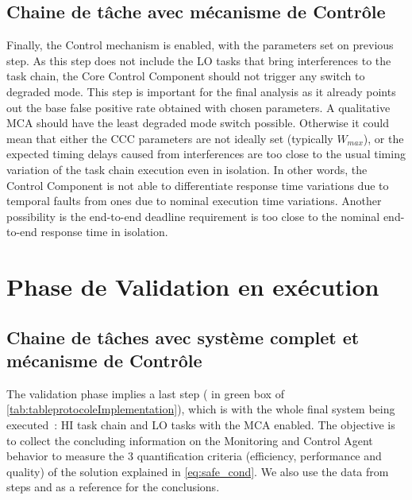 \documentclass[french, a4paper, 11pt, twoside, pdftex]{StyleThese}
\begin{document}
    \subsection{Chaine de tâche avec mécanisme de Contrôle}
                	Finally, the Control mechanism is enabled, with the parameters set on previous step. As this step does not include the LO tasks that bring interferences to the task chain, the Core Control Component should not trigger any switch to degraded mode. This step is important for the final analysis as it already points out the base false positive rate obtained with chosen parameters. A qualitative MCA should have the least degraded mode switch possible. Otherwise it could mean that either the CCC parameters are not ideally set (typically $W_{max}$), or the expected timing delays caused from interferences are too close to the usual timing variation of the task chain execution even in isolation. In other words, the Control Component is not able to differentiate response time variations due to temporal faults from ones due to nominal execution time variations. Another possibility is the end-to-end deadline requirement is too close to the nominal end-to-end response time in isolation. %
                	
                	
\section{Phase de Validation en exécution}
    \subsection{Chaine de tâches avec système complet et mécanisme de Contrôle}
                    The validation phase implies a last step ( in green box of \autoref{tab:tableprotocoleImplementation}), which is with the whole final system being executed~: HI task chain and LO tasks with the MCA enabled. The objective is to collect the concluding information on the Monitoring and Control Agent behavior to measure the 3 quantification criteria (efficiency, performance and quality) of the solution explained in \autoref{eq:safe_cond}. We also use the data from steps  and  as a reference for the conclusions.
\ifdefined{}
\else


\end{document}
